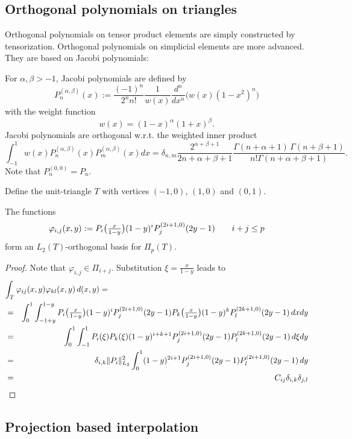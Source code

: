 \subsection{Orthogonal polynomials on triangles}
%
Orthogonal polynomials on tensor product elements are simply
constructed by tensorization. Orthogonal polynomials on simplicial
elements are more advanced. They are based on Jacobi polynomials:

For $\alpha, \beta > -1$, Jacobi polynomials are defined by 
$$
P_n^{(\alpha, \beta)}(x) := \frac{(-1)^n}{2^n n!} \frac{1}{w(x)} \frac{d^n}{dx^n} \big( w(x) (1-x^2)^n \big)
$$
with the weight function 
$$
w(x) = (1-x)^\alpha (1+x)^\beta.
$$
Jacobi polynomials are orthogonal w.r.t. the weighted inner product
$$
\int_{-1}^1 w(x) P_n^{(\alpha,\beta)}(x) P_m^{(\alpha, \beta)}(x) dx = \delta_{n,m} \frac{2^{\alpha+\beta+1}}{2n+\alpha+\beta+1} \frac{ \Gamma(n+\alpha+1) \, \Gamma (n+\beta+1) } { n! \Gamma (n+\alpha+\beta+1)}.
$$
Note that $P^{(0,0)}_n = P_n$.

Define the unit-triangle $T$ with vertices $(-1,0)$,  $(1,0)$ and $(0,1)$. 
\begin{lemma}  The functions
$$
\varphi_{i,j} (x,y) := P_i \big( { \textstyle \frac{x}{1-y} } \big) (1-y)^i P_j^{(2i+1,0)} (2y-1)
\qquad i+j \leq p
$$ 
form an $L_2(T)$-orthogonal basis for $\Pi_p(T)$.
\end{lemma}
\begin{proof}
Note that $\varphi_{i,j} \in \Pi_{i+j}$. Substitution $\xi = \frac{x}{1-y}$ leads to
\begin{eqnarray*}
\lefteqn{ \int_T \varphi_{ij}(x,y) \varphi_{kl} (x,y) \, d(x,y) = } \\
& = & \int_0^1 \int_{-1+y}^{1-y} 
 P_i \big( \sfrac{x}{1-y} \big) (1-y)^i P_j^{(2i+1,0)} (2y-1)
 P_k \big( \sfrac{x}{1-y} \big) (1-y)^k P_l^{(2k+1,0)} (2y-1) \, dx dy \\
& = & \int_0^1 \int_{-1}^1 P_i(\xi) P_k(\xi) (1-y)^{i+k+1} P_j^{(2i+1,0)} (2y-1) P_l^{(2k+1,0)}(2y-1) \, d\xi dy \\
& = & \delta_{i,k} \| P_i \|_{L_2}^2 \int_0^1 (1-y)^{2i+1} P_j^{(2i+1,0)}(2y-1) P_l^{(2i+1,0)}(2y-1) \, dy \\
& = & C_{ij} \delta_{i,k} \delta_{j,l} 
\end{eqnarray*}
\end{proof}



\subsection{Projection based interpolation}

